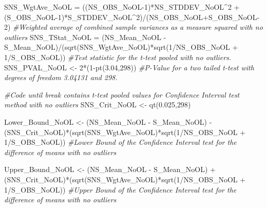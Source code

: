 \documentclass[
]{article}
\newenvironment{Shaded}{\begin{snugshade}}{\end{snugshade}}
\newcommand{\CommentTok}[1]{\textcolor[rgb]{0.56,0.35,0.01}{\textit{#1}}}
\newcommand{\DecValTok}[1]{\textcolor[rgb]{0.00,0.00,0.81}{#1}}
\newcommand{\FloatTok}[1]{\textcolor[rgb]{0.00,0.00,0.81}{#1}}
\newcommand{\FunctionTok}[1]{\textcolor[rgb]{0.00,0.00,0.00}{#1}}
\newcommand{\NormalTok}[1]{#1}
\newcommand{\OtherTok}[1]{\textcolor[rgb]{0.56,0.35,0.01}{#1}}
\newcommand{\SpecialCharTok}[1]{\textcolor[rgb]{0.00,0.00,0.00}{#1}}
\begin{document}
\begin{Shaded}
\begin{Highlighting}[]
\NormalTok{SNS\_WgtAve\_NoOL }\OtherTok{=}\NormalTok{ ((NS\_OBS\_NoOL}\DecValTok{{-}1}\NormalTok{)}\SpecialCharTok{*}\NormalTok{NS\_STDDEV\_NoOL}\SpecialCharTok{\^{}}\DecValTok{2} \SpecialCharTok{+}\NormalTok{ (S\_OBS\_NoOL}\DecValTok{{-}1}\NormalTok{)}\SpecialCharTok{*}\NormalTok{S\_STDDEV\_NoOL}\SpecialCharTok{\^{}}\DecValTok{2}\NormalTok{)}\SpecialCharTok{/}\NormalTok{(NS\_OBS\_NoOL}\SpecialCharTok{+}\NormalTok{S\_OBS\_NoOL}\DecValTok{{-}2}\NormalTok{) }\CommentTok{\#Weighted average of combined sample variances as a measure squared with no outliers}
\NormalTok{SNS\_TStat\_NoOL }\OtherTok{=}\NormalTok{ (NS\_Mean\_NoOL }\SpecialCharTok{{-}}\NormalTok{ S\_Mean\_NoOL)}\SpecialCharTok{/}\NormalTok{(}\FunctionTok{sqrt}\NormalTok{(SNS\_WgtAve\_NoOL)}\SpecialCharTok{*}\FunctionTok{sqrt}\NormalTok{(}\DecValTok{1}\SpecialCharTok{/}\NormalTok{NS\_OBS\_NoOL }\SpecialCharTok{+} \DecValTok{1}\SpecialCharTok{/}\NormalTok{S\_OBS\_NoOL)) }\CommentTok{\#Test statistic for the t{-}test pooled with no outliers. }
\NormalTok{SNS\_PVAL\_NoOL }\OtherTok{\textless{}{-}} \DecValTok{2}\SpecialCharTok{*}\NormalTok{(}\DecValTok{1}\SpecialCharTok{{-}}\FunctionTok{pt}\NormalTok{(}\FloatTok{3.04}\NormalTok{,}\DecValTok{298}\NormalTok{)) }\CommentTok{\#P{-}Value for a two tailed t{-}test with degrees of freedom 3.04131 and 298.  }




\CommentTok{\#Code until break contains t{-}test pooled values for Confidence Interval test method with no outliers }
\NormalTok{SNS\_Crit\_NoOL }\OtherTok{\textless{}{-}} \FunctionTok{qt}\NormalTok{(}\FloatTok{0.025}\NormalTok{,}\DecValTok{298}\NormalTok{)}

\NormalTok{Lower\_Bound\_NoOL }\OtherTok{\textless{}{-}}\NormalTok{ (NS\_Mean\_NoOL }\SpecialCharTok{{-}}\NormalTok{ S\_Mean\_NoOL) }\SpecialCharTok{{-}}\NormalTok{ (SNS\_Crit\_NoOL)}\SpecialCharTok{*}\NormalTok{(}\FunctionTok{sqrt}\NormalTok{(SNS\_WgtAve\_NoOL)}\SpecialCharTok{*}\FunctionTok{sqrt}\NormalTok{(}\DecValTok{1}\SpecialCharTok{/}\NormalTok{NS\_OBS\_NoOL }\SpecialCharTok{+} \DecValTok{1}\SpecialCharTok{/}\NormalTok{S\_OBS\_NoOL)) }\CommentTok{\#Lower Bound of the Confidence Interval test for the difference of means with no outliers}

\NormalTok{Upper\_Bound\_NoOL }\OtherTok{\textless{}{-}}\NormalTok{ (NS\_Mean\_NoOL }\SpecialCharTok{{-}}\NormalTok{ S\_Mean\_NoOL) }\SpecialCharTok{+}\NormalTok{ (SNS\_Crit\_NoOL)}\SpecialCharTok{*}\NormalTok{(}\FunctionTok{sqrt}\NormalTok{(SNS\_WgtAve\_NoOL)}\SpecialCharTok{*}\FunctionTok{sqrt}\NormalTok{(}\DecValTok{1}\SpecialCharTok{/}\NormalTok{NS\_OBS\_NoOL }\SpecialCharTok{+} \DecValTok{1}\SpecialCharTok{/}\NormalTok{S\_OBS\_NoOL)) }\CommentTok{\#Upper Bound of the Confidence Interval test for the difference of means with no outliers}
\end{Highlighting}
\end{Shaded}
\end{document}
